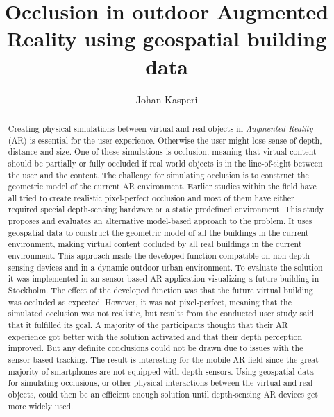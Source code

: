 \documentclass[siggraph]{acmart}
\begin{document}
\title{Occlusion in outdoor Augmented Reality using geospatial building data}

\author{Johan Kasperi}

\begin{abstract}
Creating physical simulations between virtual and real objects in \textit{Augmented Reality} (AR) is essential for the user experience. Otherwise the user might lose sense of depth, distance and size. One of these simulations is occlusion, meaning that virtual content should be partially or fully occluded if real world objects is in the line-of-sight between the user and the content. The challenge for simulating occlusion is to construct the geometric model of the current AR environment. Earlier studies within the field have all tried to create realistic pixel-perfect occlusion and most of them have either required special depth-sensing hardware or a static predefined environment. This study proposes and evaluates an alternative model-based approach to the problem. It uses geospatial data to construct the geometric model of all the buildings in the current environment, making virtual content occluded by all real buildings in the current environment. This approach made the developed function compatible on non depth-sensing devices and in a dynamic outdoor urban environment. To evaluate the solution it was implemented in an sensor-based AR application visualizing a future building in Stockholm. The effect of the developed function was that the future virtual building was occluded as expected. However, it was not pixel-perfect, meaning that the simulated occlusion was not realistic, but results from the conducted user study said that it fulfilled its goal. A majority of the participants thought that their AR experience got better with the solution activated and that their depth perception improved. But any definite conclusions could not be drawn due to issues with the sensor-based tracking. The result is interesting for the mobile AR field since the great majority of smartphones are not equipped with depth sensors. Using geospatial data for simulating occlusions, or other physical interactions between the virtual and real objects, could then be an efficient enough solution until depth-sensing AR devices get more widely used.
\end{abstract}


\maketitle





\end{document}
